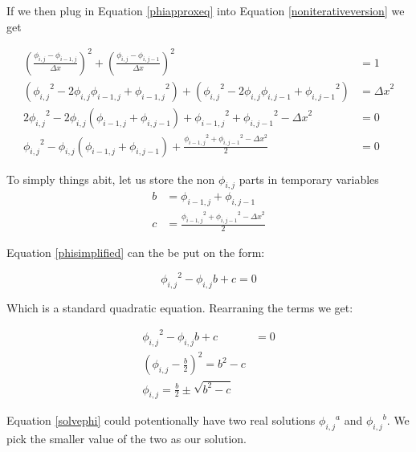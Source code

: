 If we then plug in Equation \ref{phiapproxeq} into Equation \ref{noniterativeversion} we get

\begin{equation}
\begin{split}
{(\frac{\phi_{i,j} - \phi_{i-1,j}}{\Delta x})}^2 + {(\frac{\phi_{i,j} - \phi_{i,j-1}}{\Delta x})}^2 &= 1 \\ 
({\phi_{i,j}}^2 - 2\phi_{i,j}\phi_{i-1,j} + {\phi_{i-1,j}}^2) + 
({\phi_{i,j}}^2 - 2\phi_{i,j}\phi_{i,j-1} + {\phi_{i,j-1}}^2)
&= {\Delta x}^2 \\
2{\phi_{i,j}}^2 - 2\phi_{i,j}(\phi_{i-1,j} + \phi_{i,j-1}) + {\phi_{i-1,j}}^2 + {\phi_{i,j-1}}^2 - {\Delta x}^2 &= 0 \\
{\phi_{i,j}}^2 - \phi_{i,j}(\phi_{i-1,j} + \phi_{i,j-1}) + \frac{{\phi_{i-1,j}}^2 + {\phi_{i,j-1}}^2 - {\Delta x}^2}{2} &= 0
\end{split}
\label{phisimplified}
\end{equation}

To simply things abit, let us store the non $\phi_{i,j}$ parts in temporary variables
\begin{equation}
\begin{split}
b &= \phi_{i-1,j} + \phi_{i,j-1} \\
c &= \frac{{\phi_{i-1,j}}^2 + {\phi_{i,j-1}}^2 - {\Delta x}^2}{2}
\end{split}
\label{variablesreinit}
\end{equation}

Equation \ref{phisimplified} can the be put on the form:

\begin{equation} 
{\phi_{i,j}}^2 - \phi_{i,j} b + c = 0
\end{equation}

Which is a standard quadratic equation. Rearraning the terms we get:

\begin{equation} 
\begin{split}
{\phi_{i,j}}^2 - \phi_{i,j} b + c &= 0 \\
{(\phi_{i,j} - \frac{b}{2})}^2  = b^2 - c \\
\phi_{i,j} =  \frac{b}{2} \pm \sqrt{b^2 - c}
\end{split}
\label{solvephi}
\end{equation}

Equation \ref{solvephi} could potentionally have two real solutions ${\phi_{i,j}}^a$ and ${\phi_{i,j}}^b$. We pick the smaller value of the two as our solution. 

